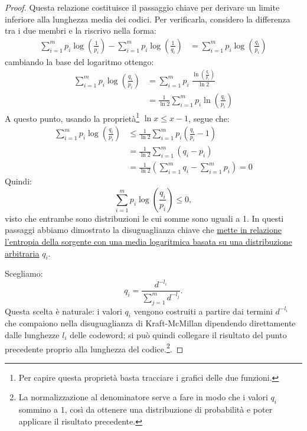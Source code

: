 \documentclass{article}
\theoremstyle{definition}
\numberwithin{equation}{section}
\begin{document}
\begin{proof}
    Questa relazione costituisce il passaggio chiave per derivare un limite inferiore alla lunghezza media dei codici. Per verificarla, considero la differenza tra i due membri e la riscrivo nella forma:
    \begin{align*}
        \sum_{i=1}^m p_i \log\!\left(\frac{1}{p_i}\right)
        - \sum_{i=1}^m p_i \log\!\left(\frac{1}{q_i}\right)
         & = \sum_{i=1}^m p_i \log\!\left(\frac{q_i}{p_i}\right)
    \end{align*}
    cambiando la base del logaritmo ottengo:
    \begin{align*}
        \sum_{i=1}^m p_i \log\!\left(\frac{q_i}{p_i}\right)
         & = \sum_{i=1}^m p_i\;\frac{\ln\left(\frac{q_i}{p_i}\right)}{\ln 2}   \\
         & = \frac{1}{\ln 2}\sum_{i=1}^m p_i \ln\!\left(\frac{q_i}{p_i}\right)
    \end{align*}
    A questo punto, usando la proprietà\footnote{Per capire questa proprietà basta tracciare i grafici delle due funzioni.} $\ln x \leq x-1$, segue che:
    \begin{align*}
        \sum_{i=1}^m p_i \log\!\left(\frac{q_i}{p_i}\right)
         & \leq \frac{1}{\ln 2}\sum_{i=1}^m p_i \!\left(\frac{q_i}{p_i} - 1\right) \\
         & = \frac{1}{\ln 2}\sum_{i=1}^m (q_i - p_i)                               \\
         & = \frac{1}{\ln 2}\left(\sum_{i=1}^m q_i - \sum_{i=1}^m p_i\right) = 0
    \end{align*}
    Quindi:
    \[
        \sum_{i=1}^m p_i \log\!\left(\frac{q_i}{p_i}\right) \leq 0,
    \]
    visto che entrambe sono distribuzioni le cui somme sono uguali a 1. In questi passaggi abbiamo dimostrato la disuguaglianza chiave che \uline{mette in relazione l'entropia della sorgente con una media logaritmica basata su una distribuzione arbitraria} $q_i$.

    Scegliamo:
    \[
        q_i=\frac{d^{-l_i}}{\sum_{j=1}^m d^{-l_j}}.
    \]
    Questa scelta è naturale: i valori $q_i$ vengono costruiti a partire dai termini $d^{-l_i}$ che compaiono nella disuguaglianza di Kraft-McMillan dipendendo direttamente dalle lunghezze $l_i$ delle codeword; si può quindi collegare il risultato del punto precedente proprio alla lunghezza del codice.\footnote{La normalizzazione al denominatore serve a fare in modo che i valori $q_i$ sommino a $1$, così da ottenere una distribuzione di probabilità e poter applicare il risultato precedente.}.


\end{proof}
\end{document}
